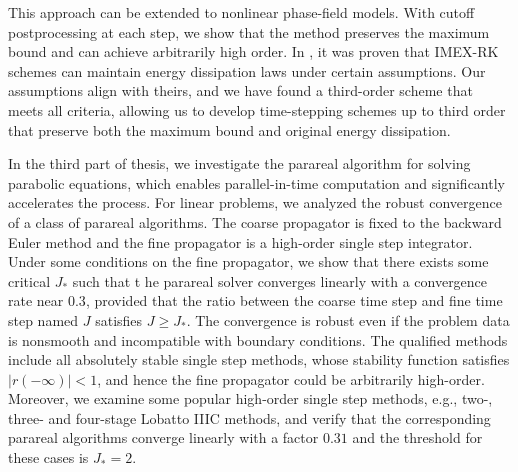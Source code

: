 \documentclass[a4paper, oneside]{book}
\def\calA{{\mathcal{A}}}
\def\bbR{{\mathbb{R}}}
\def\bbR{\mathbb{R}}
\def\calA{{\mathcal{A}}}
\begin{document}
This approach can be extended to nonlinear phase-field models. With cutoff postprocessing at each step, we show that the method preserves the maximum bound and can achieve arbitrarily high order. In \cite{fu2024energy}, it was proven that IMEX-RK schemes can maintain energy dissipation laws under certain assumptions. Our assumptions align with theirs, and we have found a third-order scheme that meets all criteria, allowing us to develop time-stepping schemes up to third order that preserve both the maximum bound and original energy dissipation.
 

In the third part of thesis, we investigate the parareal algorithm for solving parabolic equations, which enables parallel-in-time computation and significantly accelerates the process. For linear problems, we analyzed the robust convergence of a class of parareal algorithms. 
The coarse propagator is fixed to the backward Euler method 
and the fine propagator is a high-order single step integrator. 
Under some conditions on the fine propagator, 
we show that there exists some critical $J_*$ such that t
he parareal solver converges linearly with a convergence 
rate near $0.3$, provided that the ratio between the coarse 
time step and fine time step named $J$ satisfies $J \ge J_*$. 
The convergence is robust even if the problem data is nonsmooth and incompatible with boundary conditions. 
The qualified methods include all absolutely stable single 
step methods, whose stability function satisfies 
$|r(-\infty)|<1$, and hence the fine propagator could be 
arbitrarily high-order. Moreover, we examine some popular 
high-order single step methods, e.g., two-, three- and 
four-stage Lobatto IIIC methods, and verify that the 
corresponding parareal algorithms converge linearly with a 
factor $0.31$ and the threshold for these cases is $J_* = 2$. 



 

\end{document}
